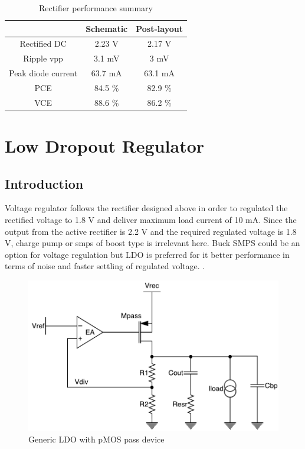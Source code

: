 \documentclass[12pt,a4paper,UKenglish]{report}
\begin{document}
\begin{table}[H]
\caption{Rectifier performance summary}
\begin{center}
\begin{tabular}{c|c|c}
\hline \hline
				 & \textbf{Schematic}		& \textbf{Post-layout} \\
\hline \hline
Rectified DC	 	& 2.23 V 				& 2.17 V	\\ \hline
Ripple \acrshort{vpp} & 3.1 mV 				& 3 mV	\\ \hline
Peak diode current 	& 63.7 mA 			&	63.1 mA	\\ \hline
PCE 				& 84.5 \% 				&	82.9 \%	\\ \hline
VCE 				& 88.6 \% 				&	86.2 \%	\\
\hline \hline
\end{tabular}
\end{center}
\label{tab:rect_spec}
\end{table}


\chapter{Low Dropout Regulator}

\section{Introduction}		%

Voltage regulator follows the rectifier designed above in order to regulated the rectified voltage to 1.8 V and 
deliver maximum load current of 10 mA. Since the output from the active rectifier is 2.2 V and the required 
regulated voltage is 1.8 V, charge pump or  \acrshort{smps} of boost type is irrelevant here. Buck SMPS could be 
an option for voltage regulation but LDO is preferred for it better performance in terms of noise and faster 
settling of regulated voltage.  \cite{ldo_psu}.\\ 

\begin{figure}[htbp] %
   \centering
   \includegraphics[width=\textwidth]{img/ldo.pdf} 
   \caption{Generic LDO with pMOS pass device}
   \label{ldo_gen}
\end{figure}
\end{document}
